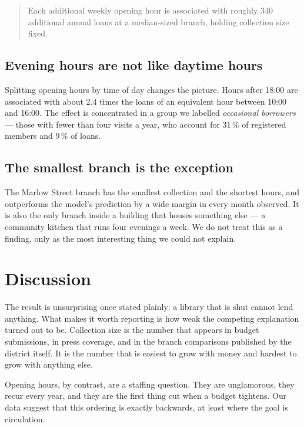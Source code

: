 \documentclass[11pt,a4paper]{article}
\begin{document}
\begin{quote}
Each additional weekly opening hour is associated with roughly 340 additional
annual loans at a median-sized branch, holding collection size fixed.
\end{quote}

\subsection{Evening hours are not like daytime hours}

Splitting opening hours by time of day changes the picture. Hours after 18:00
are associated with about 2.4 times the loans of an equivalent hour between
10:00 and 16:00. The effect is concentrated in a group we labelled
\emph{occasional borrowers} --- those with fewer than four visits a year, who
account for 31\,\% of registered members and 9\,\% of loans.

\subsection{The smallest branch is the exception}

The Marlow Street branch has the smallest collection and the shortest hours, and
outperforms the model's prediction by a wide margin in every month observed. It
is also the only branch inside a building that houses something else --- a
community kitchen that runs four evenings a week. We do not treat this as a
finding, only as the most interesting thing we could not explain.

\section{Discussion}
\label{sec:discussion}

The result is unsurprising once stated plainly: a library that is shut cannot
lend anything. What makes it worth reporting is how weak the competing
explanation turned out to be. Collection size is the number that appears in
budget submissions, in press coverage, and in the branch comparisons published
by the district itself. It is the number that is easiest to grow with money and
hardest to grow with anything else.

Opening hours, by contrast, are a staffing question. They are unglamorous, they
recur every year, and they are the first thing cut when a budget tightens. Our
data suggest that this ordering is exactly backwards, at least where the goal is
circulation.
\end{document}
